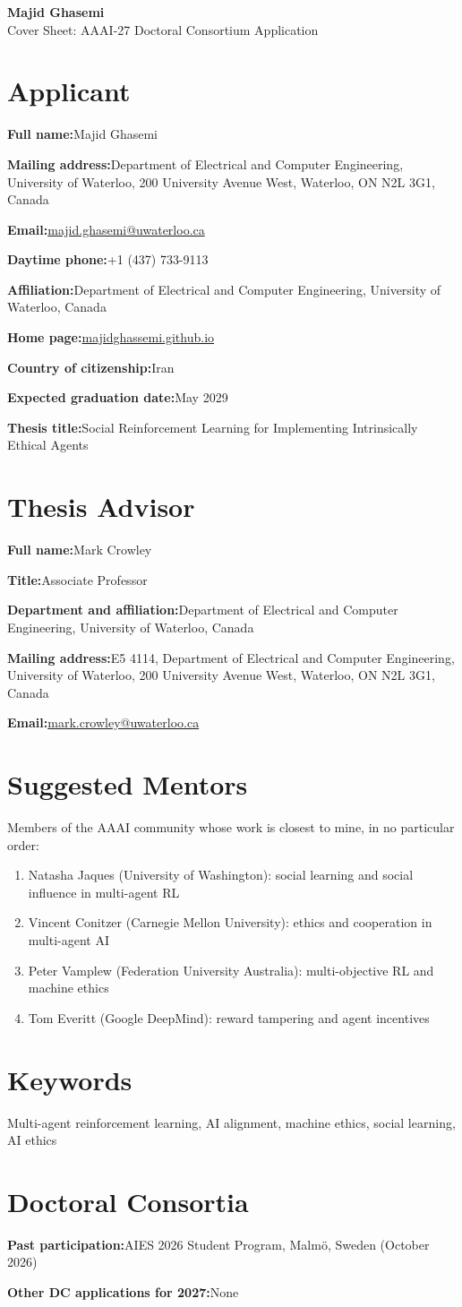 \documentclass[letterpaper,11pt]{article}
\newcommand{\field}[2]{\textbf{#1}\quad #2\par}
\begin{document}
\begin{center}
  {\LARGE\bfseries Majid Ghasemi}\\[0.3em]
  {\large Cover Sheet: AAAI-27 Doctoral Consortium Application}
\end{center}

\section{Applicant}
\field{Full name:}{Majid Ghasemi}
\field{Mailing address:}{Department of Electrical and Computer Engineering, University of Waterloo, 200 University Avenue West, Waterloo, ON N2L 3G1, Canada}
\field{Email:}{\href{mailto:majid.ghasemi@uwaterloo.ca}{majid.ghasemi@uwaterloo.ca}}
\field{Daytime phone:}{+1 (437) 733-9113}
\field{Affiliation:}{Department of Electrical and Computer Engineering, University of Waterloo, Canada}
\field{Home page:}{\href{https://majidghassemi.github.io}{majidghassemi.github.io}}
\field{Country of citizenship:}{Iran}
\field{Expected graduation date:}{May 2029}
\field{Thesis title:}{Social Reinforcement Learning for Implementing Intrinsically Ethical Agents}

\section{Thesis Advisor}
\field{Full name:}{Mark Crowley}
\field{Title:}{Associate Professor}
\field{Department and affiliation:}{Department of Electrical and Computer Engineering, University of Waterloo, Canada}
\field{Mailing address:}{E5 4114, Department of Electrical and Computer Engineering, University of Waterloo, 200 University Avenue West, Waterloo, ON N2L 3G1, Canada}
\field{Email:}{\href{mailto:mark.crowley@uwaterloo.ca}{mark.crowley@uwaterloo.ca}}

\section{Suggested Mentors}
Members of the AAAI community whose work is closest to mine, in no particular order:
\begin{enumerate}[leftmargin=1.6em,itemsep=0pt,topsep=0pt]
  \item Natasha Jaques (University of Washington): social learning and social influence in multi-agent RL
  \item Vincent Conitzer (Carnegie Mellon University): ethics and cooperation in multi-agent AI
  \item Peter Vamplew (Federation University Australia): multi-objective RL and machine ethics
  \item Tom Everitt (Google DeepMind): reward tampering and agent incentives
\end{enumerate}

\section{Keywords}
Multi-agent reinforcement learning, AI alignment, machine ethics, social learning, AI ethics

\section{Doctoral Consortia}
\field{Past participation:}{AIES 2026 Student Program, Malm\"o, Sweden (October 2026)}
\field{Other DC applications for 2027:}{None}
\end{document}
